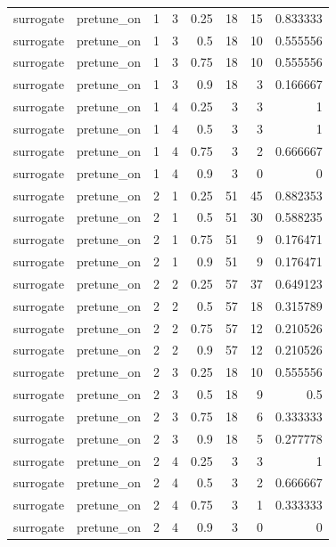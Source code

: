 \begin{table}[htbp]
\begin{tabular}{lrrrrrrr}
surrogate & pretune\_on & 1 & 3 & 0.25 & 18 & 15 & 0.833333 \\
surrogate & pretune\_on & 1 & 3 & 0.5 & 18 & 10 & 0.555556 \\
surrogate & pretune\_on & 1 & 3 & 0.75 & 18 & 10 & 0.555556 \\
surrogate & pretune\_on & 1 & 3 & 0.9 & 18 & 3 & 0.166667 \\
surrogate & pretune\_on & 1 & 4 & 0.25 & 3 & 3 & 1 \\
surrogate & pretune\_on & 1 & 4 & 0.5 & 3 & 3 & 1 \\
surrogate & pretune\_on & 1 & 4 & 0.75 & 3 & 2 & 0.666667 \\
surrogate & pretune\_on & 1 & 4 & 0.9 & 3 & 0 & 0 \\
surrogate & pretune\_on & 2 & 1 & 0.25 & 51 & 45 & 0.882353 \\
surrogate & pretune\_on & 2 & 1 & 0.5 & 51 & 30 & 0.588235 \\
surrogate & pretune\_on & 2 & 1 & 0.75 & 51 & 9 & 0.176471 \\
surrogate & pretune\_on & 2 & 1 & 0.9 & 51 & 9 & 0.176471 \\
surrogate & pretune\_on & 2 & 2 & 0.25 & 57 & 37 & 0.649123 \\
surrogate & pretune\_on & 2 & 2 & 0.5 & 57 & 18 & 0.315789 \\
surrogate & pretune\_on & 2 & 2 & 0.75 & 57 & 12 & 0.210526 \\
surrogate & pretune\_on & 2 & 2 & 0.9 & 57 & 12 & 0.210526 \\
surrogate & pretune\_on & 2 & 3 & 0.25 & 18 & 10 & 0.555556 \\
surrogate & pretune\_on & 2 & 3 & 0.5 & 18 & 9 & 0.5 \\
surrogate & pretune\_on & 2 & 3 & 0.75 & 18 & 6 & 0.333333 \\
surrogate & pretune\_on & 2 & 3 & 0.9 & 18 & 5 & 0.277778 \\
surrogate & pretune\_on & 2 & 4 & 0.25 & 3 & 3 & 1 \\
surrogate & pretune\_on & 2 & 4 & 0.5 & 3 & 2 & 0.666667 \\
surrogate & pretune\_on & 2 & 4 & 0.75 & 3 & 1 & 0.333333 \\
surrogate & pretune\_on & 2 & 4 & 0.9 & 3 & 0 & 0 \\
\bottomrule
\end{tabular}
\end{table}
